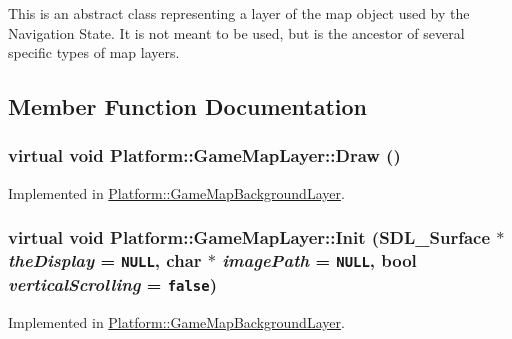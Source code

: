 This is an abstract class representing a layer of the map object used by the Navigation State. It is not meant to be used, but is the ancestor of several specific types of map layers. 

\subsection{Member Function Documentation}
\hypertarget{class_platform_1_1_game_map_layer_cc44f193d8cf01e97fe34cb7da72e640}{
\subsubsection[{Draw}]{\setlength{\rightskip}{0pt plus 5cm}virtual void Platform::GameMapLayer::Draw ()}}
\label{d8/d53/class_platform_1_1_game_map_layer_cc44f193d8cf01e97fe34cb7da72e640}




Implemented in \hyperlink{class_platform_1_1_game_map_background_layer_f6910e7841ae5315baa5fd956202a982}{Platform::GameMapBackgroundLayer}.\hypertarget{class_platform_1_1_game_map_layer_a25bd5a4d69574dfb3cefdd544e36e8d}{
\subsubsection[{Init}]{\setlength{\rightskip}{0pt plus 5cm}virtual void Platform::GameMapLayer::Init (SDL\_\-Surface $\ast$ {\em theDisplay} = {\tt NULL}, \/  char $\ast$ {\em imagePath} = {\tt NULL}, \/  bool {\em verticalScrolling} = {\tt false})}}
\label{d8/d53/class_platform_1_1_game_map_layer_a25bd5a4d69574dfb3cefdd544e36e8d}




Implemented in \hyperlink{class_platform_1_1_game_map_background_layer_449a95c15187b1ae358a0216a589df3f}{Platform::GameMapBackgroundLayer}.